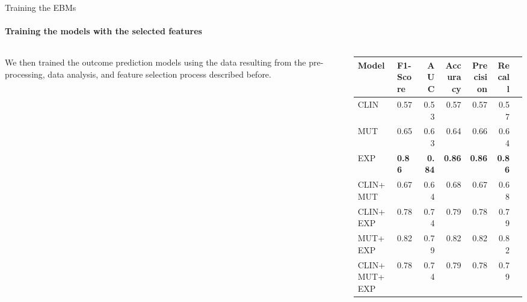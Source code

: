 

\begin{frame}{Training the EBMs}
\framesubtitle{Training the models with the selected features}

\begin{columns}
    \begin{column}{0.25\textwidth} 
    We then trained the outcome prediction models using the data resulting from the pre-processing, data analysis, and feature selection process described before.
    \end{column}

    \begin{column}{0.7\textwidth}
        
\small

\begin{table}[htb!]
    \centering
   
    \label{tab:all-results}    
    \begin{tabular}{llrrrrr}
        \toprule
        Model &  F1-Score & AUC &  Accuracy &  Precision &    Recall \\
        \midrule
        CLIN                        &  0.57 &  0.53 &  0.57 &   0.57 &  0.57 \\
        MUT                         &  0.65 &  0.63 &  0.64 &   0.66 &  0.64 \\
        EXP                           &  \textbf{0.86} &  \textbf{0.84} &  \textbf{0.86} &   \textbf{0.86} &  \textbf{0.86} \\
        CLIN+MUT              &  0.67 &  0.64 &  0.68 &   0.67 &  0.68 \\
        CLIN+EXP                &  0.78 &  0.74 &  0.79 &   0.78 &  0.79 \\
        MUT+EXP                &  0.82 &  0.79 &  0.82 &   0.82 &  0.82 \\
        CLIN+MUT+EXP     &  0.78 &  0.74 &  0.79 &   0.78 &  0.79 \\
      

\end{tabular}
\end{table}
\end{column}
\end{columns}
\end{frame}
